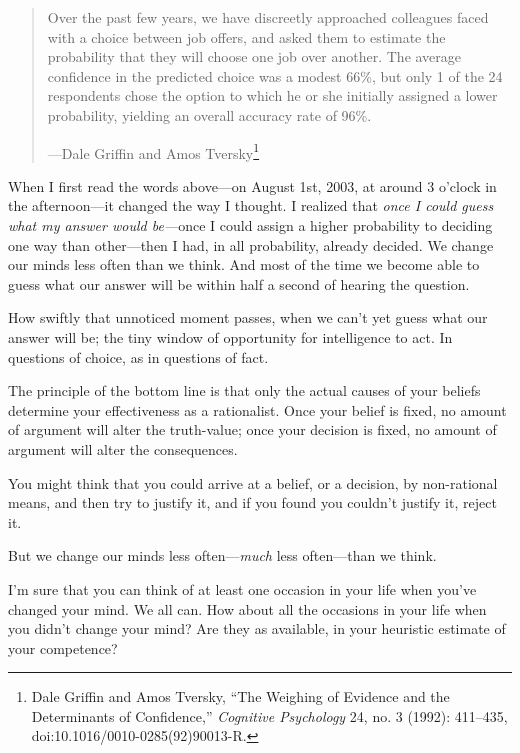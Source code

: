 \myendsectiontext


\begin{quote}
{
 Over the past few years, we have discreetly approached colleagues
faced with a choice between job offers, and asked them to estimate the
probability that they will choose one job over another. The average
confidence in the predicted choice was a modest 66\%, but only 1 of the
24 respondents chose the option to which he or she initially assigned a
lower probability, yielding an overall accuracy rate of 96\%.}

{\raggedleft
 {}---Dale Griffin and Amos Tversky\footnote{Dale Griffin and Amos Tversky, ``The Weighing
of Evidence and the Determinants of Confidence,''
\textit{Cognitive Psychology} 24, no. 3 (1992): 411--435,
doi:10.1016/0010-0285(92)90013-R.}
\par}
\end{quote}


{
 When I first read the words above---on August 1st, 2003, at around
3 o'clock in the afternoon---it changed the way I
thought. I realized that \textit{once I could guess what my answer
would be---}once I could assign a higher probability to deciding one
way than other---then I had, in all probability, already decided. We
change our minds less often than we think. And most of the time we
become able to guess what our answer will be within half a second of
hearing the question.}

{
 How swiftly that unnoticed moment passes, when we
can't yet guess what our answer will be; the tiny
window of opportunity for intelligence to act. In questions of choice,
as in questions of fact.}

{
 The principle of the bottom line is that only the actual causes of
your beliefs determine your effectiveness as a rationalist. Once your
belief is fixed, no amount of argument will alter the truth-value; once
your decision is fixed, no amount of argument will alter the
consequences.}

{
 You might think that you could arrive at a belief, or a decision,
by non-rational means, and then try to justify it, and if you found you
couldn't justify it, reject it.}

{
 But we change our minds less often---\textit{much} less
often---than we think.}

{
 I'm sure that you can think of at least one
occasion in your life when you've changed your mind. We
all can. How about all the occasions in your life when you
didn't change your mind? Are they as available, in your
heuristic estimate of your competence?}

